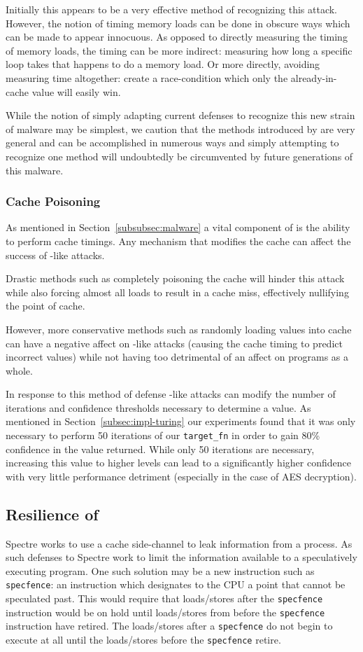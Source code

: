Initially this appears to be a very effective method of recognizing this attack.
However, the notion of timing memory loads can be done in obscure ways which can
be made to appear innocuous. As opposed to directly measuring the timing of
memory loads, the timing can be more indirect: measuring how long a specific
loop takes that happens to do a memory load. Or more directly, avoiding
measuring time altogether: create a race-condition which only the
already-in-cache value will easily win.

While the notion of simply adapting current defenses to recognize this new
strain of malware may be simplest, we caution that the methods introduced by
\speculake are very general and can be accomplished in numerous ways and simply
attempting to recognize one method will undoubtedly be circumvented by future
generations of this malware.

\subsubsection{Cache Poisoning}
As mentioned in Section~\ref{subsubsec:malware} a vital component of \speculake
is the ability to perform cache timings. Any mechanism that modifies the cache
can affect the success of \speculake-like attacks. 

Drastic methods such as completely poisoning the cache will hinder this attack
while also forcing almost all loads to result in a cache miss, effectively
nullifying the point of cache.

However, more conservative methods such as randomly loading values into cache
can have a negative affect on \speculake-like attacks (causing the cache timing
to predict incorrect values) while not having too detrimental of an affect on
programs as a whole.

In response to this method of defense \speculake-like attacks can modify the
number of iterations and confidence thresholds necessary to determine a value.
As mentioned in Section~\ref{subsec:impl-turing} our experiments found that it
was only necessary to perform 50 iterations of our \texttt{target\_fn} in order
to gain 80\% confidence in the value returned. While only 50 iterations are
necessary, increasing this value to higher levels can lead to a significantly
higher confidence with very little performance detriment (especially in the
case of AES decryption).

\subsection{Resilience of \speculake}
Spectre works to use a cache side-channel to leak information from a process. As
such defenses to Spectre work to limit the information available to a
speculatively executing program. One such solution may be a new instruction such
as  \texttt{specfence}: an instruction which designates to the CPU a point that
cannot be speculated past. This would require that loads/stores after the
\texttt{specfence} instruction would be on hold until loads/stores from before
the \texttt{specfence} instruction have retired. The loads/stores after a
\texttt{specfence} do not begin to execute at all until the loads/stores before
the \texttt{specfence} retire.

